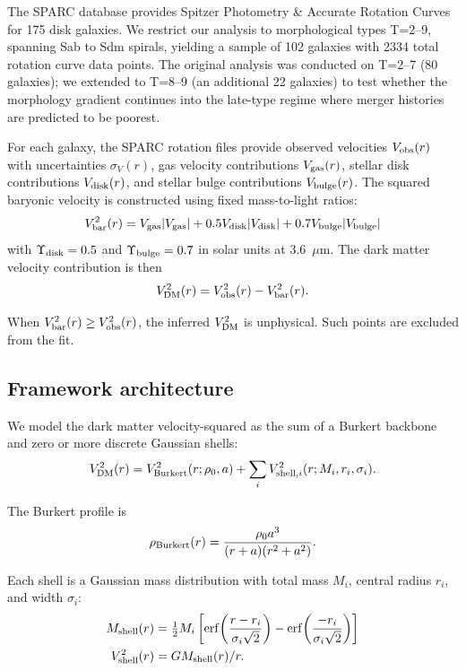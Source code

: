The SPARC database \citep{Lelli2016} provides Spitzer Photometry \& Accurate Rotation Curves for 175 disk galaxies. We restrict our analysis to morphological types T=2--9, spanning Sab to Sdm spirals, yielding a sample of 102 galaxies with 2334 total rotation curve data points. The original analysis was conducted on T=2--7 (80 galaxies); we extended to T=8--9 (an additional 22 galaxies) to test whether the morphology gradient continues into the late-type regime where merger histories are predicted to be poorest.

For each galaxy, the SPARC rotation files provide observed velocities $V_{\rm obs}(r)$ with uncertainties $\sigma_V(r)$, gas velocity contributions $V_{\rm gas}(r)$, stellar disk contributions $V_{\rm disk}(r)$, and stellar bulge contributions $V_{\rm bulge}(r)$. The squared baryonic velocity is constructed using fixed mass-to-light ratios:
\begin{equation}
V^2_{\rm bar}(r) = V_{\rm gas}|V_{\rm gas}| + 0.5 V_{\rm disk}|V_{\rm disk}| + 0.7 V_{\rm bulge}|V_{\rm bulge}|
\label{eq:vbar}
\end{equation}
with $\Upsilon_{\rm disk} = 0.5$ and $\Upsilon_{\rm bulge} = 0.7$ in solar units at 3.6~$\mu$m. The dark matter velocity contribution is then
\begin{equation}
V^2_{\rm DM}(r) = V^2_{\rm obs}(r) - V^2_{\rm bar}(r).
\label{eq:vdm}
\end{equation}

When $V^2_{\rm bar}(r) \geq V^2_{\rm obs}(r)$, the inferred $V^2_{\rm DM}$ is unphysical. Such points are excluded from the fit.

\subsection{Framework architecture}
\label{sec:arch}

We model the dark matter velocity-squared as the sum of a Burkert backbone and zero or more discrete Gaussian shells:
\begin{equation}
V^2_{\rm DM}(r) = V^2_{\rm Burkert}(r; \rho_0, a) + \sum_i V^2_{{\rm shell},i}(r; M_i, r_i, \sigma_i).
\label{eq:framework}
\end{equation}

The Burkert profile is
\begin{equation}
\rho_{\rm Burkert}(r) = \frac{\rho_0 a^3}{(r + a)(r^2 + a^2)}.
\end{equation}

Each shell is a Gaussian mass distribution with total mass $M_i$, central radius $r_i$, and width $\sigma_i$:
\begin{align}
M_{\rm shell}(r) &= \tfrac{1}{2} M_i \left[ \mathrm{erf}\!\left(\frac{r - r_i}{\sigma_i\sqrt{2}}\right) - \mathrm{erf}\!\left(\frac{-r_i}{\sigma_i\sqrt{2}}\right) \right] \\
V^2_{\rm shell}(r) &= G M_{\rm shell}(r) / r.
\end{align}

